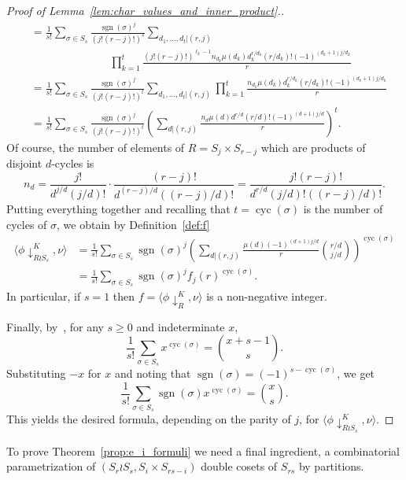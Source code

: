 \documentclass[10pt]{article}
\theoremstyle{definition}
\DeclareMathOperator\cyc{cyc}
\DeclareMathOperator\sgn{sgn}
\begin{document}
\begin{proof}[Proof of  Lemma~\ref{lem:char_values_and_inner_product}.]
\begin{align*}
        &= \frac{1}{s!} \sum_{\sigma\in S_s} 
        \frac{\sgn(\sigma)^j}{(j!(r-j)!)^s} 
        \sum_{d_1,\ldots, d_t | (r,j)}\\
        &\, \qquad\qquad\qquad\quad
        \prod_{k=1}^{t} 
        \frac{(j!(r-j)!)^{\ell_k-1} n_{d_k} \mu(d_k) d_k^{r/d_k} (r/d_k)! (-1)^{(d_k+1)j/d_k}}{r} \\
        &= \frac{1}{s!} \sum_{\sigma\in S_s} 
        \frac{\sgn(\sigma)^j}{(j!(r-j)!)^t} 
        \sum_{d_1,\ldots, d_t | (r,j)}
        \prod_{k=1}^{t} 
        \frac{n_{d_k} \mu(d_k) d_k^{r/d_k} (r/d_k)! (-1)^{(d_k+1)j/d_k}}{r} \\
        &= \frac{1}{s!} \sum_{\sigma \in S_s} 
        \frac{\sgn(\sigma)^j}{(j!(r-j)!)^t} 
        \left( \sum_{d|(r,j)} \frac{n_d \mu(d)d^{r/d}(r/d)!  (-1)^{(d+1)j/d}}{r} \right)^t.
    \end{align*}
    Of course, the number of elements of $R = S_j \times S_{r-j}$ which are products of disjoint $d$-cycles is
    \[
        n_d
        = \frac{j!}{d^{j/d} (j/d)!} \cdot \frac{(r-j)!}{d^{(r-j)/d} ((r-j)/d)!}
        = \frac{j!(r-j)!}{d^{r/d}(j/d)!((r-j)/d)!}.
    \]
    Putting everything together
    and recalling that $t = \cyc(\sigma)$ is the number of cycles of $\sigma$,
    we obtain by Definition~\ref{def:f}
    \begin{align*} 
        \langle \phi\downarrow_{R \wr S_{s}}^K,\nu \rangle
        &= \frac{1}{s!} \sum_{\sigma \in S_s} \sgn(\sigma)^j 
        \left( \sum_{d|(r,j)} \frac{\mu(d)(-1)^{(d+1)j/d}}{r} \binom{r/d}{j/d} \right)^{\cyc(\sigma)} \\
        &= \frac{1}{s!} \sum_{\sigma \in S_s} \sgn(\sigma)^j f_j(r)^{\cyc(\sigma)}.
    \end{align*}
    In particular, if $s=1$ then $f = \langle \phi\downarrow_R^K,\nu \rangle$
    is a non-negative integer.
		
    Finally, by~\cite[Proposition 1.3.4]{EC1}, for any $s \ge 0$ and indeterminate $x$, 
    \[
        \frac{1}{s!} \sum_{\sigma \in S_s} x^{\cyc(\sigma)}
        = \binom{x+s-1}{s}.
    \]
    Substituting $-x$ for $x$ and noting that 
    $\sgn(\sigma) = (-1)^{s-\cyc(\sigma)}$, we get
    \[
        \frac{1}{s!} \sum_{\sigma \in S_s} \sgn(\sigma) x^{\cyc(\sigma)} 
        = \binom{x}{s}.
    \]
    This yields the desired formula,
    depending on the parity of $j$,
    for $\langle \phi\downarrow_{R \wr S_{s}}^K,\nu \rangle$.
\end{proof}

To prove Theorem~\ref{prop:e_i_formuli} we need a final ingredient, a combinatorial parametrization of 
$(S_r\wr S_s,S_i\times S_{rs-i})$ double cosets of $S_{rs}$  by partitions.
\end{document}
